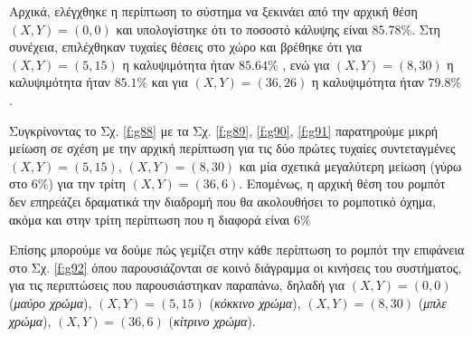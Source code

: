 Αρχικά, ελέγχθηκε η περίπτωση το σύστημα να ξεκινάει από την αρχική θέση $(X,Y) = (0,0)$ και υπολογίστηκε ότι το ποσοστό κάλυψης είναι $85.78\%$. Στη συνέχεια, επιλέχθηκαν τυχαίες θέσεις στο χώρο και βρέθηκε ότι για $(X,Y) = (5,15)$ η καλυψιμότητα ήταν $85.64\%$ , ενώ για $(X,Y) = (8,30)$ η καλυψιμότητα ήταν $85.1\%$ και για $(X,Y) = (36,26)$ η καλυψιμότητα ήταν $79.8\%$. 

Συγκρίνοντας το Σχ. \ref{f:g88} με τα Σχ. \ref{f:g89}, \ref{f:g90}, \ref{f:g91} παρατηρούμε μικρή μείωση σε σχέση με την αρχική περίπτωση για τις δύο πρώτες τυχαίες συντεταγμένες $(X,Y) = (5,15)$, $(X,Y) = (8,30)$ και μία σχετικά μεγαλύτερη μείωση (γύρω στο $6\%$) για την τρίτη $(X,Y) = (36,6)$. Επομένως, η αρχική θέση του ρομπότ δεν επηρεάζει δραματικά την διαδρομή που θα ακολουθήσει το ρομποτικό όχημα, ακόμα και στην τρίτη περίπτωση που η διαφορά είναι  $6\%$

Επίσης μπορούμε να δούμε πώς γεμίζει στην κάθε περίπτωση το ρομπότ την επιφάνεια στο Σχ. \ref{f:g92} όπου
παρουσιάζονται σε κοινό διάγραμμα οι κινήσεις του συστήματος, για τις περιπτώσεις που παρουσιάστηκαν παραπάνω, δηλαδή για $(X,Y) = (0,0)$ (\emph{μαύρο χρώμα}), $(X,Y) = (5,15)$ (\emph{κόκκινο χρώμα}), $(X,Y) = (8,30)$ (\emph{μπλε χρώμα}), $(X,Y) = (36,6)$ (\emph{κίτρινο χρώμα}).

